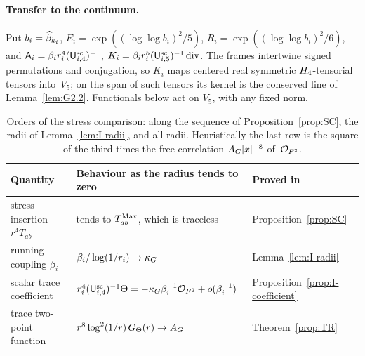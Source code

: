 \paragraph{Transfer to the continuum.}
Put $b_i=\widehat{\beta}_{k_i}$, $E_i=\exp((\log\log b_i)^2/5)$, $R_i=\exp((\log\log b_i)^2/6)$, and $\mathsf A_i=\beta_ir_i^4(\mathsf{U}_{i,4}^{\mathrm{sc}})^{-1}$, $K_i=\beta_ir_i^5(\mathsf{U}_{i,5}^{\mathrm{sc}})^{-1}\operatorname{div}$. The frames intertwine signed permutations and conjugation, so $K_i$ maps centered real symmetric $H_4$-tensorial tensors into~$V_5$; on the span of such tensors its kernel is the conserved line of Lemma~\ref{lem:G2.2}. Functionals below act on $V_5$, with any fixed norm.

\begin{table}[ht]
\centering\small
\begin{tabular}{@{}lll@{}}
\toprule
Quantity & Behaviour as the radius tends to zero & Proved in\\
\midrule
stress insertion $r^4T_{ab}$ & tends to $T^{\mathrm{Max}}_{ab}$, which is traceless & Proposition~\ref{prop:SC}\\
running coupling $\beta_i$ & $\beta_i/\log(1/r_i)\to\kappa_G$ & Lemma~\ref{lem:I-radii}\\
scalar trace coefficient & $r_i^4(\mathsf{U}_{i,4}^{\mathrm{sc}})^{-1}\Theta=-\kappa_G\beta_i^{-1}\mathcal{O}_{F^2}+o(\beta_i^{-1})$ & Proposition~\ref{prop:I-coefficient}\\
trace two-point function & $r^8\log^2(1/r)\,G_{\Theta}(r)\to A_G$ & Theorem~\ref{prop:TR}\\
\bottomrule
\end{tabular}
\caption{Orders of the stress comparison: along the sequence of Proposition~\ref{prop:SC}, the radii of Lemma~\ref{lem:I-radii}, and all radii. Heuristically the last row is the square of the third times the free correlation $A_G|x|^{-8}$ of~$\mathcal{O}_{F^2}$.}\label{tab:I-orders}
\end{table}

